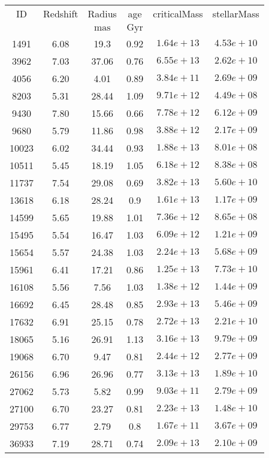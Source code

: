 \begin{table}
\begin{tabular}{cccccc}
ID & Redshift & Radius & age & criticalMass & stellarMass \\
 &  & $\mathrm{mas}$ & $\mathrm{Gyr}$ &  &  \\
1491 & 6.08 & 19.3 & 0.92 & $1.64e+13$ & $4.53e+10$ \\
3962 & 7.03 & 37.06 & 0.76 & $6.55e+13$ & $2.62e+10$ \\
4056 & 6.20 & 4.01 & 0.89 & $3.84e+11$ & $2.69e+09$ \\
8203 & 5.31 & 28.44 & 1.09 & $9.71e+12$ & $4.49e+08$ \\
9430 & 7.80 & 15.66 & 0.66 & $7.78e+12$ & $6.12e+09$ \\
9680 & 5.79 & 11.86 & 0.98 & $3.88e+12$ & $2.17e+09$ \\
10023 & 6.02 & 34.44 & 0.93 & $1.88e+13$ & $8.01e+08$ \\
10511 & 5.45 & 18.19 & 1.05 & $6.18e+12$ & $8.38e+08$ \\
11737 & 7.54 & 29.08 & 0.69 & $3.82e+13$ & $5.60e+10$ \\
13618 & 6.18 & 28.24 & 0.9 & $1.61e+13$ & $1.17e+09$ \\
14599 & 5.65 & 19.88 & 1.01 & $7.36e+12$ & $8.65e+08$ \\
15495 & 5.54 & 16.47 & 1.03 & $6.09e+12$ & $1.21e+09$ \\
15654 & 5.57 & 24.38 & 1.03 & $2.24e+13$ & $5.68e+09$ \\
15961 & 6.41 & 17.21 & 0.86 & $1.25e+13$ & $7.73e+10$ \\
16108 & 5.56 & 7.56 & 1.03 & $1.38e+12$ & $1.44e+09$ \\
16692 & 6.45 & 28.48 & 0.85 & $2.93e+13$ & $5.46e+09$ \\
17632 & 6.91 & 25.15 & 0.78 & $2.72e+13$ & $2.21e+10$ \\
18065 & 5.16 & 26.91 & 1.13 & $3.16e+13$ & $9.79e+09$ \\
19068 & 6.70 & 9.47 & 0.81 & $2.44e+12$ & $2.77e+09$ \\
26156 & 6.96 & 26.96 & 0.77 & $3.13e+13$ & $1.89e+10$ \\
27062 & 5.73 & 5.82 & 0.99 & $9.03e+11$ & $2.79e+09$ \\
27100 & 6.70 & 23.27 & 0.81 & $2.23e+13$ & $1.48e+10$ \\
29753 & 6.77 & 2.79 & 0.8 & $1.67e+11$ & $3.67e+09$ \\
36933 & 7.19 & 28.71 & 0.74 & $2.09e+13$ & $2.10e+09$ \\

\end{tabular}
\end{table}
